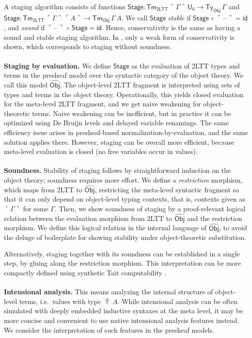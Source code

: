 \documentclass{easychair}
\newcommand{\msf}[1]{\mathsf{#1}}
\newcommand{\wh}[1]{\widehat{#1}}
\newcommand\whobj{\wh{\msf{Obj}}}
\newcommand{\Lift}{{\Uparrow}}
\newcommand{\U}{\msf{U}}
\newcommand{\Ty}{\msf{Ty}}
\newcommand{\Tm}{\msf{Tm}}
\newcommand{\id}{\msf{id}}
\newcommand{\blank}{{\mathord{\hspace{1pt}\text{--}\hspace{1pt}}}}
\newcommand{\emb}[1]{\ulcorner#1\urcorner}
\newcommand{\Stage}{\msf{Stage}}
\theoremstyle{remark}
\begin{document}
A staging algorithm consists of functions $\Stage :
\Tm_{\msf{2LTT}}\,\emb{\Gamma}\,\U_0 \to \Ty_{\msf{Obj}}\,\Gamma$ and $\Stage :
\Tm_{\msf{2LTT}}\,\emb{\Gamma}\,\emb{A} \to \Tm_{\msf{Obj}}\,\Gamma\,A$. We call
$\Stage$ \emph{stable} if $\Stage\,\circ\,\emb{\blank} = \id$, and \emph{sound}
if $\emb{\blank}\,\circ\,\Stage = \id$. Hence, conservativity is the same as
having a sound and stable staging algorithm. In \cite{twolevel}, only a weak
form of conservativity is shown, which corresponds to staging without soundness.
\\\\
\textbf{Staging by evaluation.} We define $\Stage$ as the evaluation of 2LTT
types and terms in the presheaf model over the syntactic category of the object
theory. We call this model $\whobj$. The object-level 2LTT fragment is
interpreted using sets of types and terms in the object theory. Operationally,
this yields closed evaluation for the meta-level 2LTT fragment, and we get naive
weakening for object-theoretic terms. Naive weakening can be inefficient, but in
practice it can be optimized using De Bruijn levels and delayed variable
renamings. The same efficiency issue arises in presheaf-based
normalization-by-evaluation, and the same solution applies there. However,
staging can be overall more efficient, because meta-level evaluation is closed
(no free variables occur in values).
\\\\
\textbf{Soundness.} Stability of staging follows by straightforward induction on the object theory;
soundness requires more effort. We define a \emph{restriction} morphism, which
maps from 2LTT to $\whobj$, restricting the meta-level syntactic fragment so
that it can only depend on object-level typing contexts, that is, contexts given
as $\emb{\Gamma}$ for some $\Gamma$. Then, we show soundness of staging by a
proof-relevant logical relation between the evaluation morphism from 2LTT to
$\whobj$ and the restriction morphism. We define this logical relation in the
internal language of $\whobj$, to avoid the deluge of boilerplate for showing
stability under object-theoretic substitution.

Alternatively, staging together with its soundness can be established in a
single step, by gluing along the restriction morphism. This interpretation can
be more compactly defined using synthetic Tait computability
\cite{sterlingthesis}.
\\\\
\textbf{Intensional analysis.} This means analyzing the internal structure of
object-level terms, i.e.\ values with type $\Lift\,A$. While intensional
analysis can be often simulated with deeply embedded inductive syntaxes at the
meta level, it may be more concise and convenient to use native intensional
analysis features instead. We consider the interpretation of such features in
the presheaf models.
\end{document}
